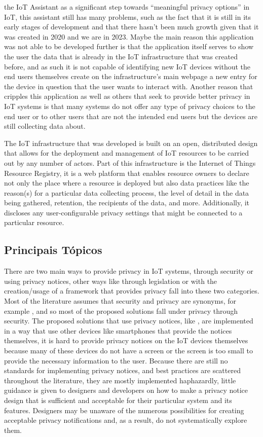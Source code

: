 \documentclass[conference]{IEEEtran}
\begin{document}
the IoT Assistant as a significant step towards ``meaningful privacy options''
in IoT, this assistant still has many problems, such as the fact that it
is still in its early stages of development and that there hasn't been much
growth given that it was created in 2020 and we are in 2023. Maybe the main
reason this application was not able to be developed further is that the
application itself serves to show the user the data that is already in the
IoT infrastructure that was created before, and as such it is not capable
of identifying new IoT devices without the end users themselves create on
the infrastructure's main webpage \cite{DasPersonalized} a new entry for
the device in question that the user wants to interact with. Another reason
that cripples this application as well as others that seek to provide better
privacy in IoT systems is that many systems do not offer any type of privacy
choices to the end user or to other users that are not the intended end
users but the devices are still collecting data about.

The IoT infrastructure that was developed \cite{DasPersonalized} is built
on an open, distributed design that allows for the deployment and management
of IoT resources to be carried out by any number of actors. Part of this
infrastructure is the Internet of Things Resource Registry, it is a web
platform that enables resource owners to declare not only the place where
a resource is deployed but also data practices like the reason(s) for a
particular data collecting process, the level of detail in the data being
gathered, retention, the recipients of the data, and more. Additionally,
it discloses any user-configurable privacy settings that might be connected
to a particular resource.

\subsection{Principais Tópicos}

There are two main ways to provide privacy in IoT systems, through security
or using privacy notices, other ways like through legislation or with the
creation/usage of a framework that provides privacy fall into these two
categories. Most of the literature assumes that security and privacy are
synonyms, for example \cite{opara2022framework, FabianoInternet, SunSecure},
and so most of the proposed solutions fall under privacy through security.
The proposed solutions that use privacy notices, like \cite{FengDesign},
are implemented in a way that use other devices like smartphones that provide
the notices themselves, it is hard to provide privacy notices on the IoT
devices themselves because many of these devices do not have a screen or
the screen is too small to provide the necessary information to the user.
Because there are still no standards for implementing privacy notices, and
best practices are scattered throughout the literature, they are mostly
implemented haphazardly, little guidance is given to designers and developers
on how to make a privacy notice design that is sufficient and acceptable
for their particular system and its features. Designers may be unaware of
the numerous possibilities for creating acceptable privacy notifications
and, as a result, do not systematically explore them.
\end{document}

